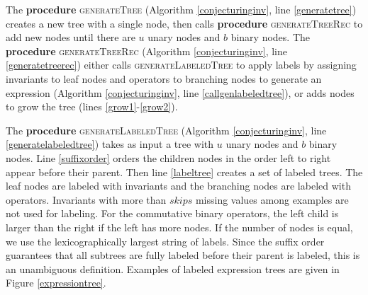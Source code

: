 \documentclass[ijds,nonblindrev]{informs-ijds}
\begin{document}
The {\bf procedure} \textsc{generateTree} (Algorithm  \ref{conjecturinginv}, line \ref{generatetree}) creates a new tree with a single node, then calls {\bf procedure} \textsc{generateTreeRec} to add new nodes until there are $u$ unary nodes and $b$ binary nodes. The {\bf procedure} \textsc{generateTreeRec} (Algorithm \ref{conjecturinginv}, line \ref{generatetreerec}) either calls \textsc{generateLabeledTree} to apply labels by assigning invariants to leaf nodes and operators to branching nodes to generate an expression (Algorithm \ref{conjecturinginv}, line \ref{callgenlabeledtree}), or adds nodes to grow the tree (lines \ref{grow1}-\ref{grow2}). 

The {\bf procedure} \textsc{generateLabeledTree} (Algorithm \ref{conjecturinginv}, line \ref{generatelabeledtree}) takes as input a tree with $u$ unary nodes and $b$ binary nodes.  Line \ref{suffixorder} orders the children nodes in the order left to right appear before their parent.  Then line \ref{labeltree} creates a set of labeled trees.  The leaf nodes are labeled with invariants and the branching nodes are labeled with operators.  Invariants with more than $skips$ missing values among examples are not used for labeling. For the commutative binary operators, the left child is larger than the right if the left has more nodes.  If the number of nodes is equal, we use the lexicographically largest string of labels. Since the suffix order guarantees that all subtrees are fully labeled before their parent is labeled, this is an unambiguous definition.  Examples of labeled expression trees are given in Figure \ref{expressiontree}.
\end{document}
